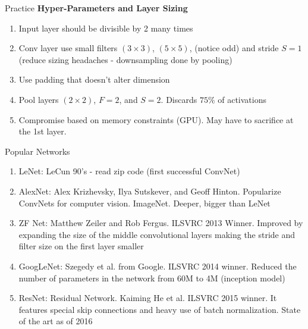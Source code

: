 \documentclass[pdf]{beamer}
\begin{document}
	
	\begin{frame}{Practice}
	\textbf{Hyper-Parameters and Layer Sizing}
	\vspace{1em}
	\begin{enumerate}
		\item Input layer should be divisible by 2 many times
		\vspace{0.5em}
		\item Conv layer use small filters $(3 \times 3)$, $(5 \times 5)$, (notice odd) and stride $S = 1$ (reduce sizing headaches - downsampling done by pooling)
		\vspace{0.5em}
		\item Use padding that doesn't alter dimension
		\vspace{0.5em}
		\item Pool layers $(2 \times 2)$, $F = 2$, and $S = 2$. Discards $75\%$ of activations
		\vspace{0.5em}
		\item Compromise based on memory constraints (GPU). May have to sacrifice at the 1st layer.
	\end{enumerate}
	\end{frame}

	\begin{frame}{Popular Networks}
	\begin{enumerate}
		\item LeNet: LeCun 90's - read zip code (first successful ConvNet)
		\vspace{0.5em}
		\item AlexNet: Alex Krizhevsky, Ilya Sutskever, and Geoff Hinton. Popularize ConvNets for computer vision. ImageNet. Deeper, bigger than LeNet
		\vspace{0.5em}
		\item ZF Net: Matthew Zeiler and Rob Fergus. ILSVRC 2013 Winner. Improved by expanding the size of the middle convolutional layers making the stride and filter size on the first layer smaller
		\vspace{0.5em}
		\item GoogLeNet: Szegedy et al. from Google. ILSVRC 2014 winner. Reduced the number of parameters in the network from 60M to 4M (inception model)
		\vspace{0.5em}
		\item ResNet: Residual Network. Kaiming He et al. ILSVRC 2015 winner. It features special skip connections and heavy use of batch normalization. State of the art as of 2016 
	\end{enumerate}
	\end{frame}
	
\end{document}

